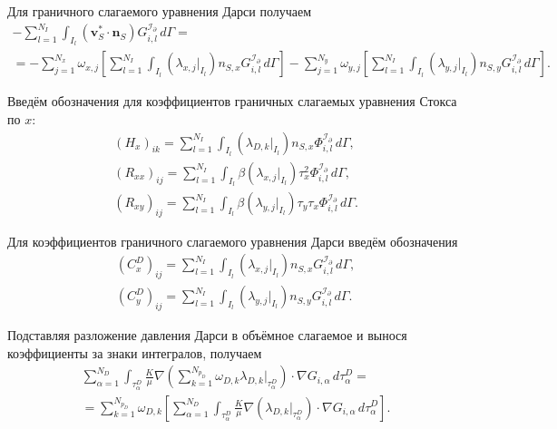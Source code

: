 \documentclass[a4paper,14pt]{extarticle}
\begin{document}
Для граничного слагаемого уравнения Дарси получаем
\begin{equation}
	\begin{gathered}
		-
		\sum_{l=1}^{N_I}
		\int_{I_l}
		(\mathbf v_S^*\cdot\mathbf n_S)
		G^{\mathcal I_\partial}_{i,l}
		\,d\Gamma
		=
		\\[6pt]
		=
		-
		\sum_{j=1}^{N_x}
		\omega_{x,j}
		\left[
			\sum_{l=1}^{N_I}
			\int_{I_l}
			\left(\lambda_{x,j}|_{I_l}\right)
			n_{S,x}
			G^{\mathcal I_\partial}_{i,l}
			\,d\Gamma
		\right]
		-
		\sum_{j=1}^{N_y}
		\omega_{y,j}
		\left[
			\sum_{l=1}^{N_I}
			\int_{I_l}
			\left(\lambda_{y,j}|_{I_l}\right)
			n_{S,y}
			G^{\mathcal I_\partial}_{i,l}
			\,d\Gamma
		\right].
	\end{gathered}
\end{equation}


\newpage
Введём обозначения для коэффициентов граничных слагаемых
уравнения Стокса по $x$:
\begin{equation}
	\begin{gathered}
		(H_x)_{ik}
		=
		\sum_{l=1}^{N_I}
		\int_{I_l}
		\left(\lambda_{D,k}|_{I_l}\right)
		n_{S,x}\Phi^{\mathcal I_\partial}_{i,l}
		\,d\Gamma,
		\\[6pt]
		(R_{xx})_{ij}
		=
		\sum_{l=1}^{N_I}
		\int_{I_l}
		\beta
		\left(\lambda_{x,j}|_{I_l}\right)
		\tau_x^2\Phi^{\mathcal I_\partial}_{i,l}
		\,d\Gamma,
		\\[6pt]
		(R_{xy})_{ij}
		=
		\sum_{l=1}^{N_I}
		\int_{I_l}
		\beta
		\left(\lambda_{y,j}|_{I_l}\right)
		\tau_y\tau_x\Phi^{\mathcal I_\partial}_{i,l}
		\,d\Gamma.
	\end{gathered}
\end{equation}

Для коэффициентов граничного слагаемого уравнения Дарси
введём обозначения
\begin{equation}
	\begin{gathered}
		(C_x^D)_{ij}
		=
		\sum_{l=1}^{N_I}
		\int_{I_l}
		\left(\lambda_{x,j}|_{I_l}\right)
		n_{S,x}G^{\mathcal I_\partial}_{i,l}
		\,d\Gamma,
		\\[6pt]
		(C_y^D)_{ij}
		=
		\sum_{l=1}^{N_I}
		\int_{I_l}
		\left(\lambda_{y,j}|_{I_l}\right)
		n_{S,y}G^{\mathcal I_\partial}_{i,l}
		\,d\Gamma.
	\end{gathered}
\end{equation}


Подставляя разложение давления Дарси в объёмное слагаемое
и вынося коэффициенты за знаки интегралов, получаем
\begin{equation}
	\begin{gathered}
		\sum_{\alpha=1}^{N_D}
		\int_{\tau^D_\alpha}
		\frac{K}{\mu}
		\nabla\left(
			\sum_{k=1}^{N_{p_D}}
			\omega_{D,k}
			\lambda_{D,k}|_{\tau^D_\alpha}
		\right)
		\cdot\nabla G_{i,\alpha}
		\,d\tau^D_\alpha
		=
		\\[6pt]
		=
		\sum_{k=1}^{N_{p_D}}
		\omega_{D,k}
		\left[
			\sum_{\alpha=1}^{N_D}
			\int_{\tau^D_\alpha}
			\frac{K}{\mu}
			\nabla\left(
				\lambda_{D,k}|_{\tau^D_\alpha}
			\right)
			\cdot\nabla G_{i,\alpha}
			\,d\tau^D_\alpha
		\right].
	\end{gathered}
\end{equation}
\end{document}
